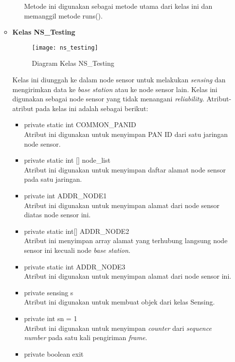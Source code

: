 \begin{itemize}
\begin{itemize}
\begin{itemize}
            Metode ini digunakan sebagai metode utama dari kelas ini dan memanggil metode runs().
        \end{itemize}
        \item \textbf{Kelas NS\_Testing}\\
        \begin{figure}[htbp]
        	\centering
        	\texttt{[image: ns\_testing]}
        	\caption{Diagram Kelas NS\_Testing}
        	\label{fig:ns_testing}
        \end{figure}
        Kelas ini diunggah ke dalam node sensor untuk melakukan \textit{sensing} dan mengirimkan data ke \textit{base station} atau ke node sensor lain. Kelas ini digunakan sebagai node sensor yang tidak menangani \textit{reliability}. Atribut-atribut pada kelas ini adalah sebagai berikut:
        \begin{itemize}
            \item private static int COMMON\_PANID\\
            Atribut ini digunakan untuk menyimpan PAN ID dari satu jaringan node sensor.
            \item private static int [] node\_list\\
            Atribut ini digunakan untuk menyimpan daftar alamat node sensor pada satu jaringan.
            \item private int ADDR\_NODE1\\
            Atribut ini digunakan untuk menyimpan alamat dari node sensor diatas node sensor ini.
            \item private static int[] ADDR\_NODE2\\
            Atribut ini menyimpan array alamat yang terhubung langsung node sensor ini kecuali node \textit{base station}.
            \item private static int ADDR\_NODE3\\
            Atribut ini digunakan untuk menyimpan alamat dari node sensor ini.
            \item private sensing s\\
            Atribut ini digunakan untuk membuat objek dari kelas Sensing.
            \item private int sn = 1\\
            Atribut ini digunakan untuk menyimpan \textit{counter} dari \textit{sequence number} pada satu kali pengiriman \textit{frame}.
            \item private boolean exit\\

\end{itemize}
\end{itemize}
\end{itemize}
